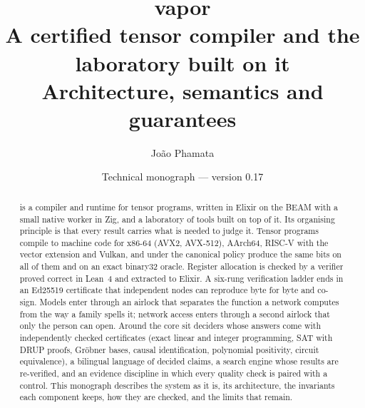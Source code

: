 \documentclass[11pt,a4paper,open=any,parskip=half,headings=standardclasses,chapterprefix=false,numbers=noenddot]{scrreprt}
\title{\Huge\bfseries\color{ink} vapor\\[0.6em]
       \LARGE\mdseries A certified tensor compiler and the laboratory built on it\\[0.4em]
       \large Architecture, semantics and guarantees}
\author{João Phamata}
\date{Technical monograph — version 0.17}
\begin{document}
\maketitle
\begin{abstract}
\vapor{} is a compiler and runtime for tensor programs, written in Elixir on the BEAM with a small
native worker in Zig, and a laboratory of tools built on top of it. Its organising principle is that
every result carries what is needed to judge it. Tensor programs compile to machine code for x86-64
(AVX2, AVX-512), AArch64, RISC-V with the vector extension and Vulkan, and under the canonical policy
produce the same bits on all of them and on an exact binary32 oracle. Register allocation is checked by
a verifier proved correct in Lean~4 and extracted to Elixir. A six-rung verification ladder ends in an
Ed25519 certificate that independent nodes can reproduce byte for byte and co-sign. Models enter
through an airlock that separates the function a network computes from the way a family spells it;
network access enters through a second airlock that only the person can open. Around the core sit
deciders whose answers come with independently checked certificates (exact linear and integer
programming, SAT with DRUP proofs, Gröbner bases, causal identification, polynomial positivity, circuit
equivalence), a bilingual language of decided claims, a search engine whose results are re-verified,
and an evidence discipline in which every quality check is paired with a control. This monograph
describes the system as it is, its architecture, the invariants each component keeps, how they are
checked, and the limits that remain.
\end{abstract}

\tableofcontents














\appendix

\end{document}
